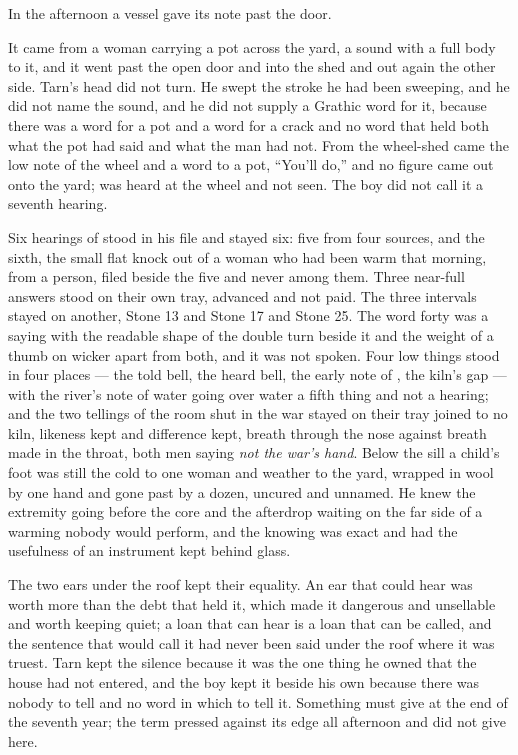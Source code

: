 \scenebreak

In the afternoon a vessel gave its note past the door.

It came from a woman carrying a pot across the yard, a sound with a full body to it, and it went past the open door and into the shed and out again the other side. Tarn’s head did not turn. He swept the stroke he had been sweeping, and he did not name the sound, and he did not supply a Grathic word for it, because there was a word for a pot and a word for a crack and no word that held both what the pot had said and what the man had not. From the wheel-shed came the low note of the wheel and a word to a pot, “You’ll do,” and no figure came out onto the yard;  was heard at the wheel and not seen. The boy did not call it a seventh hearing.

Six hearings of  stood in his file and stayed six: five from four sources, and the sixth, the small flat knock out of a woman who had been warm that morning, from a person, filed beside the five and never among them. Three near-full answers stood on their own tray, advanced and not paid. The three intervals stayed on another, Stone 13 and Stone 17 and Stone 25. The word forty was a saying with the readable shape of the double turn beside it and the weight of a thumb on wicker apart from both, and it was not spoken. Four low things stood in four places --- the told bell, the heard bell, the early note of , the kiln’s gap --- with the river’s note of water going over water a fifth thing and not a hearing; and the two tellings of the room shut in the war stayed on their tray joined to no kiln, likeness kept and difference kept, breath through the nose against breath made in the throat, both men saying \emph{not the war's hand}. Below the sill a child’s foot was still the cold to one woman and weather to the yard, wrapped in wool by one hand and gone past by a dozen, uncured and unnamed. He knew the extremity going before the core and the afterdrop waiting on the far side of a warming nobody would perform, and the knowing was exact and had the usefulness of an instrument kept behind glass.

The two ears under the roof kept their equality. An ear that could hear was worth more than the debt that held it, which made it dangerous and unsellable and worth keeping quiet; a loan that can hear is a loan that can be called, and the sentence that would call it had never been said under the roof where it was truest. Tarn kept the silence because it was the one thing he owned that the house had not entered, and the boy kept it beside his own because there was nobody to tell and no word in which to tell it. Something must give at the end of the seventh year; the term pressed against its edge all afternoon and did not give here.

